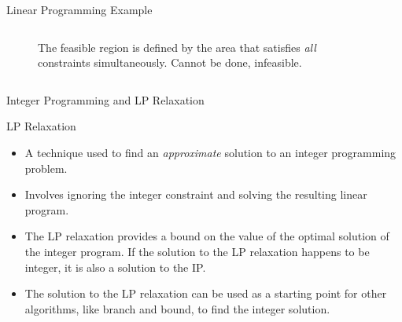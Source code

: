 \documentclass[
    NAME={Dr. Helga Ingimundardóttir},
    EMAIL={helgaingim@hi.is},
    FACULTY={Industrial Engineering},
    TITLE={Mixed Integer Programming},
    SUBTITLE={Techniques and Applications},
    SEMINAR={VÉL113F},
    DATE={Design and Optimization},
    WIDE=true
]{../HI-latex/hi-beamer}
\begin{document}
\begin{frame}{Linear Programming Example}
\begin{columns}
\begin{column}{0.5\textwidth}
\begin{figure}
                    \caption{The feasible region is defined by the area that satisfies \emph{all} constraints simultaneously.
                    Cannot be done, infeasible.}
                \end{figure}
            \end{column}
        \end{columns}

    \end{frame}


    \begin{frame}{Integer Programming and LP Relaxation}

        \begin{block}{LP Relaxation}
            \begin{itemize}
                \item A technique used to find an \emph{approximate} solution to an integer programming problem.
                \item Involves ignoring the integer constraint and solving the resulting linear program.
                \item The LP relaxation provides a bound on the value of the optimal solution of the integer program.
                If the solution to the LP relaxation happens to be integer, it is also a solution to the IP.
                \item The solution to the LP relaxation can be used as a starting point for other algorithms,
                like branch and bound, to find the integer solution.
            \end{itemize}
        \end{block}


    \end{frame}
\end{document}

